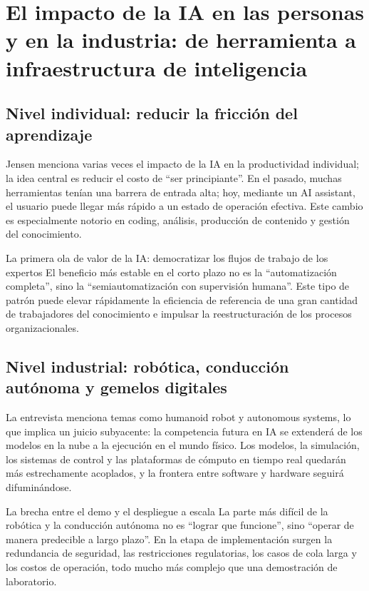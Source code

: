 \documentclass[a4paper]{article}
\begin{document}
\section{El impacto de la IA en las personas y en la industria: de herramienta a infraestructura de inteligencia}

\subsection{Nivel individual: reducir la fricción del aprendizaje}

Jensen menciona varias veces el impacto de la IA en la productividad individual; la idea central es reducir el costo de ``ser principiante''. En el pasado, muchas herramientas tenían una barrera de entrada alta; hoy, mediante un AI assistant, el usuario puede llegar más rápido a un estado de operación efectiva. Este cambio es especialmente notorio en coding, análisis, producción de contenido y gestión del conocimiento.

\begin{importantbox}{La primera ola de valor de la IA: democratizar los flujos de trabajo de los expertos}
El beneficio más estable en el corto plazo no es la ``automatización completa'', sino la ``semiautomatización con supervisión humana''. Este tipo de patrón puede elevar rápidamente la eficiencia de referencia de una gran cantidad de trabajadores del conocimiento e impulsar la reestructuración de los procesos organizacionales.
\end{importantbox}

\subsection{Nivel industrial: robótica, conducción autónoma y gemelos digitales}

La entrevista menciona temas como humanoid robot y autonomous systems, lo que implica un juicio subyacente: la competencia futura en IA se extenderá de los modelos en la nube a la ejecución en el mundo físico. Los modelos, la simulación, los sistemas de control y las plataformas de cómputo en tiempo real quedarán más estrechamente acoplados, y la frontera entre software y hardware seguirá difuminándose.

\begin{warningbox}{La brecha entre el demo y el despliegue a escala}
La parte más difícil de la robótica y la conducción autónoma no es ``lograr que funcione'', sino ``operar de manera predecible a largo plazo''. En la etapa de implementación surgen la redundancia de seguridad, las restricciones regulatorias, los casos de cola larga y los costos de operación, todo mucho más complejo que una demostración de laboratorio.
\end{warningbox}
\end{document}

